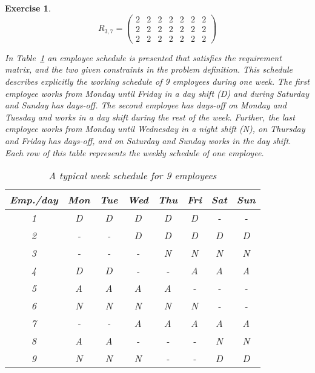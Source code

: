 \documentclass [11pt]{article}
\newtheorem{exercise}[theorem]{Exercise}
\begin{document}
\begin{exercise}
\[
R_{3,7} =
 \begin{pmatrix}
  2 & 2 & 2 & 2 & 2 & 2 & 2 \\
  2 & 2 & 2 & 2 & 2 & 2 & 2 \\
  2 & 2 & 2 & 2 & 2 & 2 & 2
  
 \end{pmatrix}
\]


\noindent In Table~\ref{typicalschedule} an employee schedule is presented that satisfies the requirement matrix, and the two given constraints in the problem definition. This schedule describes explicitly the working schedule of 9 employees during one week. The first employee works from Monday until Friday in a day shift (D) and during Saturday and Sunday has days-off. The second employee has days-off on Monday and Tuesday and works in a day shift during the rest of the week. Further, the last employee works from Monday until Wednesday in a night shift (N), on Thursday and Friday has days-off, and on Saturday and Sunday works in the day shift. Each row of this table represents the weekly schedule of one employee.      

\begin{table}[ht]
\renewcommand{\arraystretch}{1.2}
\caption{A typical week schedule for 9 employees }\label{typicalschedule}
\begin{center}
\begin{tabular}{||c|c|c|c|c|c|c|c||}  \hline
Emp./day & Mon & Tue & Wed & Thu & Fri & Sat &Sun \\ \hline \hline
1 & D & D & D & D & D & - & - \\ \hline 2 & - & - & D & D & D & D & D \\
\hline 3 & - & - & - & N & N & N & N \\ \hline 4 & D & D & - & - & A & A & A \\
\hline 5 & A & A & A & A & - & - & - \\ \hline 6 & N & N & N & N & N & - & - \\
\hline 7 & - & - & A & A & A & A & A \\ \hline 8 & A & A & - & - & - & N & N \\
\hline 9 & N & N & N & - & - & D & D \\ \hline
\end{tabular}
\end{center}
\end{table} 
 
 
 
\end{exercise}
\end{document}
